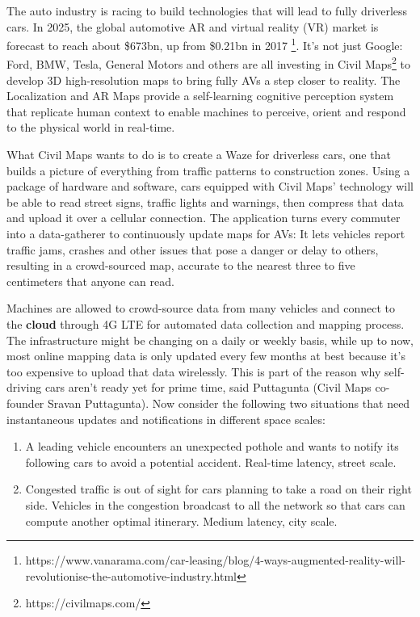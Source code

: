 \documentclass[twocolumn]{article}
\begin{document}
\par The auto industry is racing to build technologies that will lead to fully driverless cars. In 2025, the global automotive AR and virtual reality (VR) market is forecast to reach about \$673bn, up from \$0.21bn in 2017 \footnote{https://www.vanarama.com/car-leasing/blog/4-ways-augmented-reality-will-revolutionise-the-automotive-industry.html}. It's not just Google: Ford, BMW, Tesla, General Motors and others are all investing in Civil Maps\footnote{https://civilmaps.com/} to develop 3D high-resolution maps to bring fully AVs a step closer to reality. The Localization and AR Maps provide a self-learning cognitive perception system that replicate human context to enable machines to perceive, orient and respond to the physical world in real-time.
\par What Civil Maps wants to do is to create a Waze for driverless cars, one that builds a picture of everything from traffic patterns to construction zones. Using a package of hardware and software, cars equipped with Civil Maps' technology will be able to read street signs, traffic lights and warnings, then compress that data and upload it over a cellular connection.
The application turns every commuter into a data-gatherer to continuously update maps for AVs: It lets vehicles report traffic jams, crashes and other issues that pose a danger or delay to others, resulting in a crowd-sourced map, accurate to the nearest three to five centimeters that anyone can read. 

\par Machines are allowed to crowd-source data from many vehicles and connect to the \textbf{cloud} through 4G LTE for automated data collection and mapping process. The infrastructure might be changing on a daily or weekly basis, while up to now, most online mapping data is only updated every few months at best because it's too expensive to upload that data wirelessly. This is part of the reason why self-driving cars aren't ready yet for prime time, said Puttagunta (Civil Maps co-founder Sravan Puttagunta). Now consider the following two situations that need instantaneous updates and notifications in different space scales:

\begin{enumerate}
\item A leading vehicle encounters an unexpected pothole and wants to notify its following cars to avoid a potential
accident. Real-time latency, street scale.
\item Congested traffic is out of sight for cars planning to take a road on their right side. Vehicles in the congestion
broadcast to all the network so that cars can compute another optimal itinerary. Medium latency, city scale.
\end{enumerate}
\end{document}
